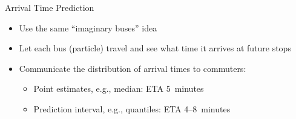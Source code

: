\documentclass[10pt,t]{beamer}
\begin{document}
\begin{frame}{Arrival Time Prediction}
  \begin{itemize}[<+->]
  \item Use the same ``imaginary buses'' idea

  \item Let each bus (particle) travel and see what time it arrives at future stops

  \item Communicate the distribution of arrival times to commuters:
    \begin{itemize}
    \item Point estimates, e.g., median: ETA 5~minutes
    \item Prediction interval, e.g., quantiles: ETA 4--8~minutes
    \end{itemize}
  \end{itemize}


\end{frame}
\end{document}

